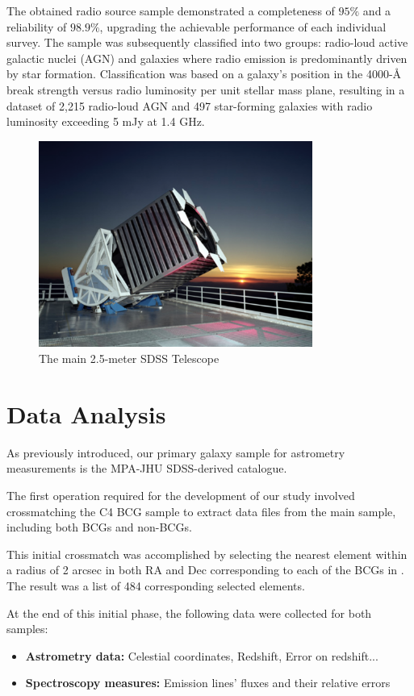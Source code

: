The obtained radio source sample demonstrated a completeness of $95\%$ and a reliability of $98.9\%$, upgrading the achievable performance of each individual survey. The sample was subsequently classified into two groups: radio-loud active galactic nuclei (AGN) and galaxies where radio emission is predominantly driven by star formation. Classification was based on a galaxy's position in the 4000-Å break strength versus radio luminosity per unit stellar mass plane, resulting in a dataset of 2,215 radio-loud AGN and 497 star-forming galaxies with radio luminosity exceeding 5 mJy at 1.4 GHz.
\vspace{3cm}
\begin{figure}[hbtp]
  \centering
  \includegraphics[width=0.8\textwidth]{SDSS}
  \caption{The main 2.5-meter SDSS Telescope }
  \label{3}
\end{figure}


\newpage
\section{Data Analysis}
As previously introduced, our primary galaxy sample for astrometry measurements is the MPA-JHU SDSS-derived catalogue.

The first operation required for the development of our study involved crossmatching the C4 BCG sample \cite{2009yCat..73790867V} to extract data files from the main sample, including both BCGs and non-BCGs.

This initial crossmatch was accomplished by selecting the nearest element within a radius of 2 arcsec in both RA and Dec corresponding to each of the BCGs in \cite{2009yCat..73790867V}. The result was a list of 484 corresponding selected elements.

At the end of this initial phase, the following data were collected for both samples:
\begin{itemize}
    \item \textbf{Astrometry data:} Celestial coordinates, Redshift, Error on redshift...
    \item \textbf{Spectroscopy measures:} Emission lines' fluxes and their relative errors
\end{itemize}

